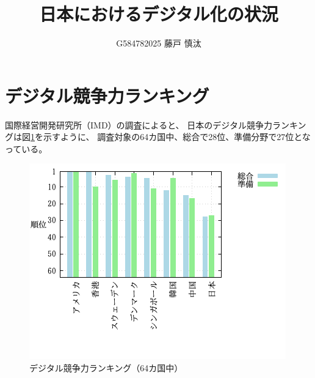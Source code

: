 \documentclass[a4paper,11pt,dvipdfmx]{ujarticle}
\title{日本におけるデジタル化の状況}
\author{G584782025 藤戸 慎汰}
\begin{document}
\maketitle 

\section{デジタル競争力ランキング}
国際経営開発研究所（IMD）の調査\cite{IMD}によると、
日本のデジタル競争力ランキングは図\ref{fig:graph}を示すように、
調査対象の64カ国中、総合で28位、準備分野で27位となっている。
\begin{figure}[htbp]
    \centering
    \includegraphics{graph.png}
    \caption{デジタル競争力ランキング（64カ国中）}\label{fig:graph}
\end{figure}

\newpage
\end{document}

